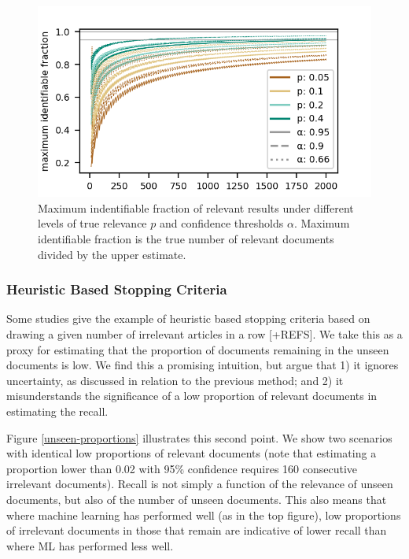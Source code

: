 \documentclass{bmcart}
\begin{document}
\begin{figure}
	\includegraphics[width=0.5\linewidth]{../images/bir_variation.png}
	\caption{Maximum indentifiable fraction of relevant results under different levels of true relevance $p$ and confidence thresholds $\alpha$. Maximum identifiable fraction is the true number of relevant documents divided by the upper estimate.}
	\label{bir-variation}
\end{figure}

		
\subsubsection*{Heuristic Based Stopping Criteria}

Some studies give the example of heuristic based stopping criteria based on drawing a given number of irrelevant articles in a row \cite{Przybya2018} [+REFS]. 
We take this as a proxy for estimating that the proportion of documents remaining in the unseen documents is low. 
We find this a promising intuition, but argue that 1) it ignores uncertainty, as discussed in relation to the previous method; and 2) it misunderstands the significance of a low proportion of relevant documents in estimating the recall.

Figure \ref{unseen-proportions} illustrates this second point. 
We show two scenarios with identical low proportions of relevant documents (note that estimating a proportion lower than 0.02 with 95\% confidence requires 160 consecutive irrelevant documents). 
Recall is not simply a function of the relevance of unseen documents, but also of the number of unseen documents. 
This also means that where machine learning has performed well (as in the top figure), low proportions of irrelevant documents in those that remain are indicative of lower recall than where ML has performed less well.
\end{document}

